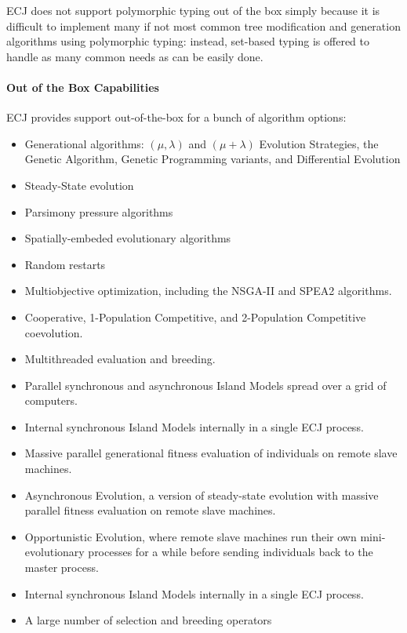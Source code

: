 \documentclass[twoside,10pt]{book}
\begin{document}
ECJ does not support polymorphic typing out of the box simply because it is difficult to implement many if not most common tree modification and generation algorithms using polymorphic typing: instead, set-based typing is offered to handle as many common needs as can be easily done. 

\paragraph{Out of the Box Capabilities}

ECJ provides support out-of-the-box for a bunch of algorithm options:

\begin{itemize}
\item Generational algorithms: \((\mu,\lambda)\) and \((\mu+\lambda)\) Evolution Strategies, the Genetic Algorithm, Genetic Programming variants, and Differential Evolution
\item Steady-State evolution
\item Parsimony pressure algorithms
\item Spatially-embeded evolutionary algorithms
\item Random restarts
\item Multiobjective optimization, including the NSGA-II and SPEA2 algorithms.
\item Cooperative, 1-Population Competitive, and 2-Population Competitive coevolution.
\item Multithreaded evaluation and breeding.
\item Parallel synchronous and asynchronous Island Models spread over a grid of computers.
\item Internal synchronous Island Models internally in a single ECJ process.
\item Massive parallel generational fitness evaluation of individuals on remote slave machines.
\item Asynchronous Evolution, a version of steady-state evolution with massive parallel fitness evaluation on remote slave machines.
\item Opportunistic Evolution, where remote slave machines run their own mini-evolutionary processes for a while before sending individuals back to the master process.
\item Internal synchronous Island Models internally in a single ECJ process.
\item A large number of selection and breeding operators
\end{itemize}
\end{document}
